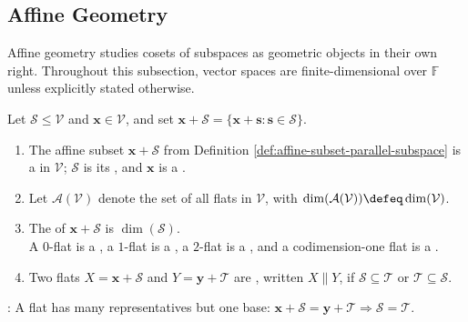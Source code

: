 \subsection{Affine Geometry}

%

Affine geometry studies cosets of subspaces as geometric objects in their own right. Throughout this subsection, vector spaces are finite-dimensional over $\mathbb{F}$ unless explicitly stated otherwise.

\begin{definition} \label{def:flat-affine-geometry}\label{def:parallel-flats} 
Let $\mathcal{S}\leq\mathcal{V}$ and $\mathbf{x}\in\mathcal{V}$, and set $\mathbf{x}+\mathcal{S}=\{\mathbf{x}+\mathbf{s}:\mathbf{s}\in\mathcal{S}\}$.
\begin{enumerate}[label=(\roman*)]
\setlength{\itemsep}{0pt}
\item The affine subset $\mathbf{x}+\mathcal{S}$ from Definition \ref{def:affine-subset-parallel-subspace} is a  in $\mathcal{V}$; $\mathcal{S}$ is its , and $\mathbf{x}$ is a .
\item Let $\mathcal{A}(\mathcal{V})$ denote the set of all flats in $\mathcal{V}$, with $\dim(\mathcal{A}(\mathcal{V}))\defeq\dim(\mathcal{V})$.
\item The  of $\mathbf{x}+\mathcal{S}$ is $\dim(\mathcal{S})$.\\
A $0$-flat is a , a $1$-flat is a , a $2$-flat is a , and a codimension-one flat is a .
\item Two flats $X=\mathbf{x}+\mathcal{S}$ and $Y=\mathbf{y}+\mathcal{T}$ are , written $X\parallel Y$, if $\mathcal{S}\subseteq\mathcal{T}$ or $\mathcal{T}\subseteq\mathcal{S}$.
\end{enumerate}
: A flat has many representatives but one base: $\mathbf{x}+\mathcal{S}=\mathbf{y}+\mathcal{T}\Rightarrow\mathcal{S}=\mathcal{T}$.\\
\end{definition}

